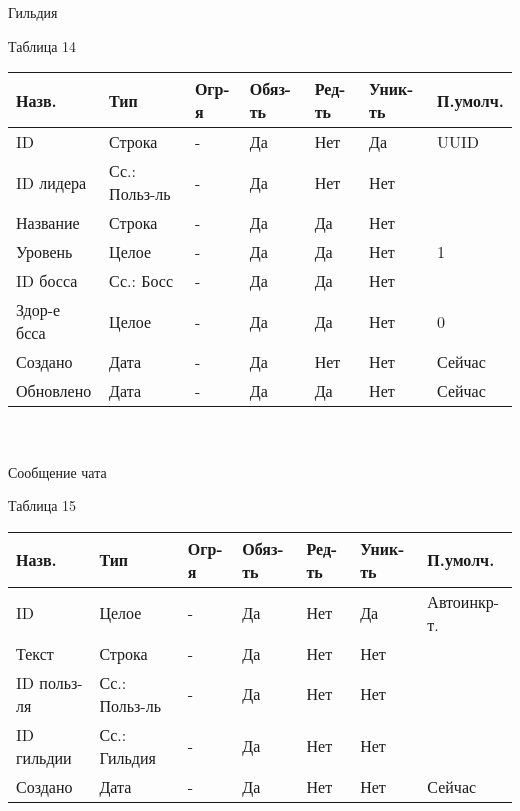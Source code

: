 \documentclass[../document.tex]{subfiles}
\begin{document}
\\\\
Гильдия
\begin{flushright}
  Таблица 14
\end{flushright}
\begin{tabular}{ | l | l | l | l | l | l | l | }
  \hline
  Назв.       & Тип           & Огр-я & Обяз-ть & Ред-ть & Уник-ть & П.умолч. \\
  \hline
  ID          & Строка        & -     & Да      & Нет    & Да      & UUID     \\
  ID лидера   & Сс.: Польз-ль & -     & Да      & Нет    & Нет     &          \\
  Название    & Строка        & -     & Да      & Да     & Нет     &          \\
  Уровень     & Целое         & -     & Да      & Да     & Нет     & 1        \\
  ID босса    & Сс.: Босс     & -     & Да      & Да     & Нет     &          \\
  Здор-е бсса & Целое         & -     & Да      & Да     & Нет     & 0        \\
  Создано     & Дата          & -     & Да      & Нет    & Нет     & Сейчас   \\
  Обновлено   & Дата          & -     & Да      & Да     & Нет     & Сейчас   \\
  \hline
\end{tabular}
\\\\
Сообщение чата
\begin{flushright}
  Таблица 15
\end{flushright}
\begin{tabular}{ | l | l | l | l | l | l | l | }
  \hline
  Назв.       & Тип           & Огр-я & Обяз-ть & Ред-ть & Уник-ть & П.умолч.    \\
  \hline
  ID          & Целое         & -     & Да      & Нет    & Да      & Автоинкр-т. \\
  Текст       & Строка        & -     & Да      & Нет    & Нет     &             \\
  ID польз-ля & Сс.: Польз-ль & -     & Да      & Нет    & Нет     &             \\
  ID гильдии  & Сс.: Гильдия  & -     & Да      & Нет    & Нет     &             \\
  Создано     & Дата          & -     & Да      & Нет    & Нет     & Сейчас      \\
  \hline
\end{tabular}
\end{document}
